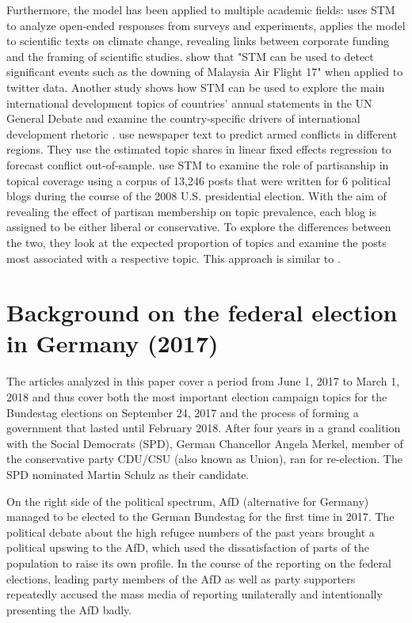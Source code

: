 \documentclass[12pt,a4paper,notitlepage]{article}
\begin{document}
Furthermore, the model has been applied to multiple academic fields: \citet{roberts_structural_2014} uses STM to analyze open-ended responses from surveys and experiments, \citet{farrell_corporate_2016} applies the model to scientific texts on climate change, revealing links between corporate funding and the framing of scientific studies. \citet{mishler_using_2015} show that "STM can be used to detect significant events such as the downing of Malaysia Air Flight 17" when applied to twitter data. Another study shows how STM can be used to explore the main international development topics of countries' annual statements in the UN General Debate and examine the country-specific drivers of international development rhetoric \citep{baturo_what_2017}. \citet{mueller_reading_2016} use newspaper text to predict armed conflicts in different regions. They use the estimated topic shares in linear fixed effects regression to forecast conflict out-of-sample. \citet{roberts_navigating_2016} use STM to examine the role of partisanship in topical coverage using a corpus of 13,246 posts that were written for 6 political blogs during the course of the 2008 U.S. presidential election. With the aim of revealing the effect of partisan membership on topic prevalence, each blog is assigned to be either liberal or conservative. To explore the differences between the two, they look at the expected proportion of topics and examine the posts most associated with a respective topic. This approach is similar to \citet{roberts_model_2016}. 

\section{Background on the federal election in Germany (2017)}\label{ch_elections}

The articles analyzed in this paper cover a period from June 1, 2017 to March 1, 2018 and thus cover both the most important election campaign topics for the Bundestag elections on September 24, 2017 and the process of forming a government that lasted until February 2018. After four years in a grand coalition with the Social Democrats (SPD), German Chancellor Angela Merkel, member of the conservative party CDU/CSU (also known as Union), ran for re-election. The SPD nominated Martin Schulz as their candidate. 

On the right side of the political spectrum, AfD (alternative for Germany) managed to be elected to the German Bundestag for the first time in 2017. The political debate about the high refugee numbers of the past years brought a political upswing to the AfD, which used the dissatisfaction of parts of the population to raise its own profile. In the course of the reporting on the federal elections, leading party members of the AfD as well as party supporters repeatedly accused the mass media of reporting unilaterally and intentionally presenting the AfD badly.
\end{document}
